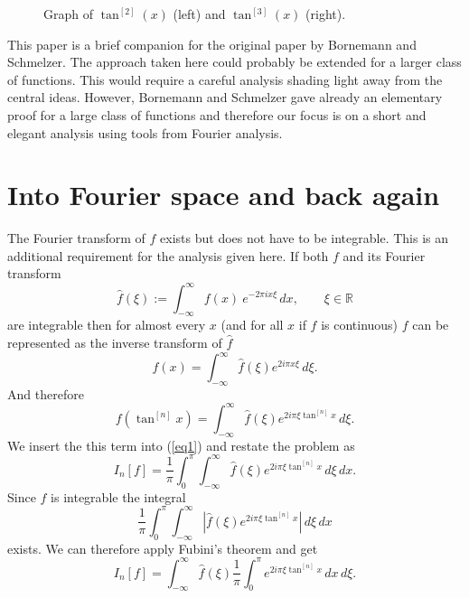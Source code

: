 \documentclass{amsart}
\theoremstyle{plain}
\numberwithin{equation}{section}
\newcommand{\R}{{\mathbb  R}}
\def\abs#1{\left|#1\right|}
\begin{document}
\begin{figure}[hb]
\begin{center}
\end{center}
\caption{Graph of  $\tan^{[2]}(x)$ (left) and $\tan^{[3]}(x)$ (right).}
\end{figure}

This paper is a brief companion for the original paper by Bornemann and Schmelzer. The approach taken here could probably be extended for a larger class of functions. This would require a careful analysis shading light away from the central ideas. 
However, Bornemann and Schmelzer \cite{BornemannSchmelzer} gave already an elementary proof for a large class of functions and therefore our focus is on a short and elegant analysis using tools from Fourier analysis.

\section{Into Fourier space and back again}
The Fourier transform of $f$ exists but does not have to be integrable. This is an additional requirement for the analysis given here.
If both $f$ and its Fourier transform
\[
\hat{f}(\xi) := \int_{-\infty}^{\infty} f(x)\ e^{- 2\pi i x \xi}\,dx,\qquad \xi \in \R
\]
are integrable then for almost every $x$ (and for all $x$ if $f$ is continuous) 
$f$ can be represented as the inverse transform of $\hat f$
\[
f(x) = \int_{-\infty}^\infty \hat f(\xi) e^{2 i \pi x \xi} \, d\xi.
\]
And therefore
\[
f(\tan^{[n]}x) = \int_{-\infty}^\infty \hat f(\xi) e^{2 i \pi \xi \tan^{[n]}x} \, d\xi.
\]
We insert the this term into (\ref{eq1}) and restate the problem as
\[
I_n[f] = \frac{1}{\pi}\int_0^\pi \int_{-\infty}^\infty \hat f(\xi) e^{2 i \pi \xi \tan^{[n]}x} \, d\xi \,dx.
\]
Since $\hat f$ is integrable the integral
\[
\frac{1}{\pi}\int_0^\pi \int_{-\infty}^\infty \abs{\hat f(\xi) e^{2 i \pi \xi \tan^{[n]}x}} \, d\xi \,dx
\]
exists. We can therefore apply Fubini's theorem and get
\begin{equation}\label{eq3}
I_n[f] = \int_{-\infty}^\infty \hat f(\xi) \frac{1}{\pi} \int_0^\pi  e^{2 i \pi \xi \tan^{[n]}x} \,dx \,d\xi. 
\end{equation}
\end{document}
